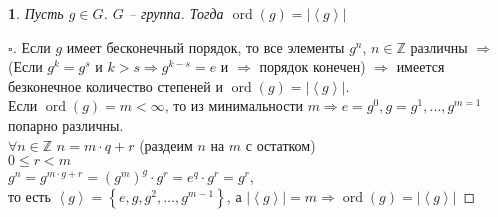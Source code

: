 \documentclass{article}
\theoremstyle{stylename}
\newtheorem*{theorem}{\fbox{Утверждение:}}
\renewcommand{\implies}{\Rightarrow}
\newcommand{\cg}[1]{\left<#1\right>}
\newcommand{\CG}[1]{\left|\cg{#1}\right|}
\newcommand{\ord}{\operatorname{ord}}
\begin{document}
  \begin{theorem}
    Пусть $g \in G$. $G$ -- группа.
    Тогда $\ord(g)=\CG{g}$
  \end{theorem}
  \begin{proof}[$\square$\nopunct]
    Если $g$ имеет бесконечный порядок, то все элементы $g^n$, $n \in \mathbb{Z}$ различны $\implies$ \\
    (Если $g^k=g^s \text{ и } k>s \implies g^{k-s}=e$ и $\implies$ порядок конечен) $\implies$
    имеется безконечное количество степеней и $\ord(g)=\CG{g}$. \\
    Если $\ord(g)=m < \infty$, то из минимальности $m \implies e=g^0, g=g^1,\dots,g^{m=1}$ попарно различны. \\
    $\forall n \in \mathbb{Z}$ \qquad
    $n = m \cdot q + r$ (раздеим $n$ на $m$ с остатком) \\
    $0 \le r < m$ \\
    $g^n = g^{m \cdot g + r} = \left(g^m\right)^g \cdot g^r = e^q \cdot g^r = g^r$, \\
    то есть $\cg{g} = \left\{ e,g,g^2,\dots,g^{m-1} \right\}$,
    а $\CG{g} = m \implies \ord(g)=\CG{g}$
  \end{proof}
\end{document}

